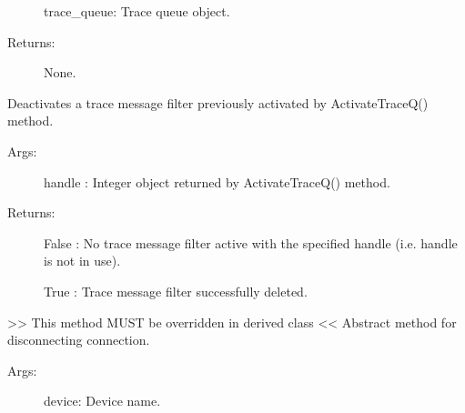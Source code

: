 \documentclass[letterpaper,10pt,english]{sphinxmanual}
\begin{document}
\begin{fulllineitems}
\begin{fulllineitems}
\begin{description}
\sphinxAtStartPar
trace\_queue: Trace queue object.

\item[{Returns:}] \leavevmode
\sphinxAtStartPar
None.

\end{description}

\end{fulllineitems}


\begin{fulllineitems}
\label{\detokenize{QConnectBase:QConnectBase.connection_base.ConnectionBase.deactivate_trace_queue}}
\sphinxAtStartPar
Deactivates a trace message filter previously activated by ActivateTraceQ() method.
\begin{description}
\item[{Args:}] \leavevmode
\sphinxAtStartPar
handle :  Integer object returned by ActivateTraceQ() method.

\item[{Returns:}] \leavevmode
\sphinxAtStartPar
False : No trace message filter active with the specified handle (i.e. handle is not in use).

\sphinxAtStartPar
True :  Trace message filter successfully deleted.

\end{description}

\end{fulllineitems}


\begin{fulllineitems}
\label{\detokenize{QConnectBase:QConnectBase.connection_base.ConnectionBase.disconnect}}
\sphinxAtStartPar
\textgreater{}\textgreater{} This method MUST be overridden in derived class \textless{}\textless{}
Abstract method for disconnecting connection.
\begin{description}
\item[{Args:}] \leavevmode
\sphinxAtStartPar
device: Device name.


\end{description}
\end{fulllineitems}
\end{fulllineitems}
\end{document}
